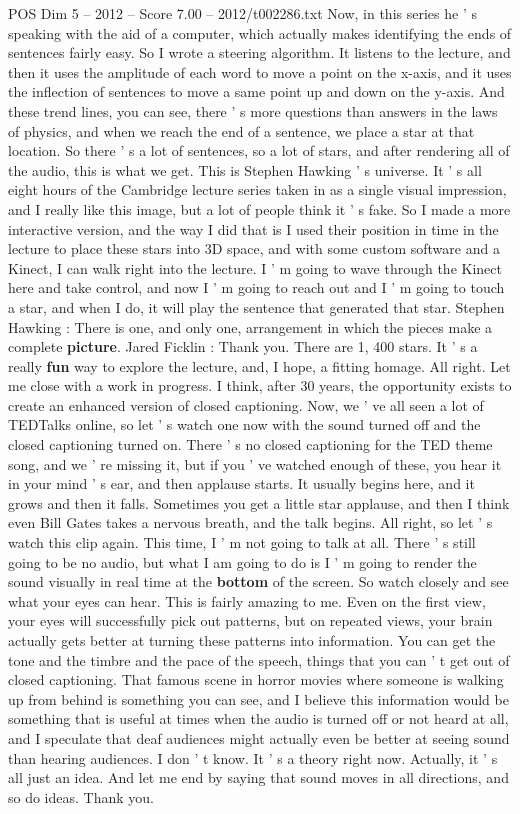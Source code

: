 \begin{textsample}{POS Dim 5 – 2012 – Score 7.00 – 2012/t002286.txt}
Now, in this series he ' s speaking with the aid of a computer, which actually makes identifying the ends of sentences fairly easy.
So I wrote a steering algorithm.
It listens to the lecture, and then it uses the amplitude of each word to move a point on the x-axis, and it uses the inflection of sentences to move a same point up and down on the y-axis.
And these trend lines, you can see, there ' s more questions than answers in the laws of physics, and when we reach the end of a sentence, we place a star at that location.
So there ' s a lot of sentences, so a lot of stars, and after rendering all of the audio, this is what we get.
This is Stephen Hawking ' s universe.
It ' s all eight hours of the Cambridge lecture series taken in as a single visual impression, and I really like this image, but a lot of people think it ' s fake.
So I made a more interactive version, and the way I did that is I used their position in time in the lecture to place these stars into 3D space, and with some custom software and a Kinect, I can walk right into the lecture.
I ' m going to wave through the Kinect here and take control, and now I ' m going to reach out and I ' m going to touch a star, and when I do, it will play the sentence that generated that star.
Stephen Hawking : There is one, and only one, arrangement in which the pieces make a complete \textbf{picture}.
Jared Ficklin : Thank you.
There are 1, 400 stars.
It ' s a really \textbf{fun} way to explore the lecture, and, I hope, a fitting homage.
All right.
Let me close with a work in progress.
I think, after 30 years, the opportunity exists to create an enhanced version of closed captioning.
Now, we ' ve all seen a lot of TEDTalks online, so let ' s watch one now with the sound turned off and the closed captioning turned on.
There ' s no closed captioning for the TED theme song, and we ' re missing it, but if you ' ve watched enough of these, you hear it in your mind ' s ear, and then applause starts.
It usually begins here, and it grows and then it falls.
Sometimes you get a little star applause, and then I think even Bill Gates takes a nervous breath, and the talk begins.
All right, so let ' s watch this clip again.
This time, I ' m not going to talk at all.
There ' s still going to be no audio, but what I am going to do is I ' m going to render the sound visually in real time at the \textbf{bottom} of the screen.
So watch closely and see what your eyes can hear.
This is fairly amazing to me.
Even on the first view, your eyes will successfully pick out patterns, but on repeated views, your brain actually gets better at turning these patterns into information.
You can get the tone and the timbre and the pace of the speech, things that you can ' t get out of closed captioning.
That famous scene in horror movies where someone is walking up from behind is something you can see, and I believe this information would be something that is useful at times when the audio is turned off or not heard at all, and I speculate that deaf audiences might actually even be better at seeing sound than hearing audiences.
I don ' t know.
It ' s a theory right now.
Actually, it ' s all just an idea.
And let me end by saying that sound moves in all directions, and so do ideas.
Thank you.


\end{textsample}
